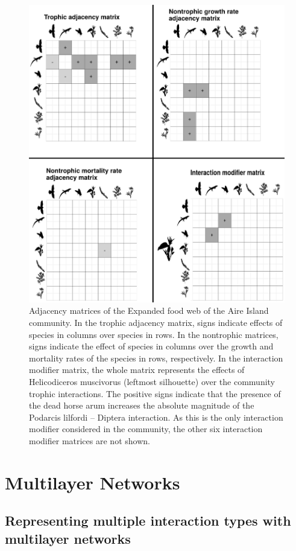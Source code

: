 \begin{figure}[ht]
\centering
\includegraphics[width=.6\textwidth]{./Figures/Appendix2_2/ExFW_all.png}
\caption[Expanded Food Web Matrices]{\color{Gray} Adjacency matrices of the Expanded food web of the Aire Island community. In the trophic adjacency matrix, signs indicate effects of species in columns over species in rows. In the nontrophic matrices, signs indicate the effect of species in columns over the growth and mortality rates of the species in rows, respectively. In the interaction modifier matrix, the whole matrix represents the effects of Helicodiceros muscivorus (leftmost silhouette) over the community trophic interactions. The positive signs indicate that the presence of the dead horse arum increases the absolute magnitude of the Podarcis lilfordi – Diptera interaction. As this is the only interaction modifier considered in the community, the other six interaction modifier matrices are not shown.}
\label{fig:figApp2.2.1}
\end{figure}

\section*{Multilayer Networks}

\subsection*{Representing multiple interaction types with multilayer networks}


